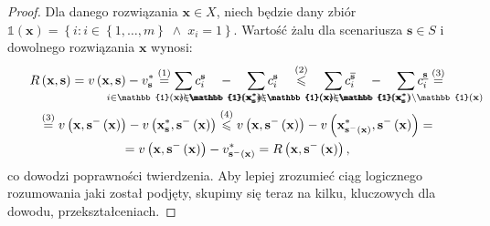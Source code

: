 \begin{proof}
	Dla danego rozwiązania $ \textbf{x} \in X$, niech będzie dany zbiór $\mathbb{1} \left( \textbf{x} \right) = \left\{ i : i \in \left\{ 1, \dots, m \right\} \; \wedge \; x_{i} = 1 \right\}$. Wartość żalu dla scenariusza $\textbf{s} \in S$ i dowolnego rozwiązania $\textbf{x}$ wynosi:
	\begin{gather*}
		R \left( \textbf{x}, \textbf{s} \right) = v \left( \textbf{x}, \textbf{s} \right) - v^{\ast}_{\textbf{s}} \overset{\left( 1 \right)}{=} \sum_{\mathclap{i \in \mathbb{1} \left( \textbf{x} \right) \setminus \mathbb{1} \left( \textbf{x}^{\ast}_{\textbf{s}} \right)}} c_{i}^{\textbf{s}} \quad - \quad \sum_{\mathclap{i \in \mathbb{1} \left( \textbf{x}^{\ast}_{\textbf{s}} \right) \setminus \mathbb{1} \left( \textbf{x} \right)}} c_{i}^{\textbf{s}} \quad \overset{\left( 2 \right)}{\leqslant} \quad \sum_{\mathclap{i \in \mathbb{1} \left( \textbf{x} \right) \setminus \mathbb{1} \left( \textbf{x}^{\ast}_{\textbf{s}} \right)}} c^{\overline{\textbf{s}}}_{i} \quad - \quad \sum_{\mathclap{i \in \mathbb{1} \left( \textbf{x}^{\ast}_{\textbf{s}} \right) \setminus \mathbb{1} \left( \textbf{x} \right)}} c^{\underline{\textbf{s}}}_{i} \overset{\left( 3 \right)}{=} \\ \overset{\left( 3 \right)}{=} v \left( \textbf{x}, \textbf{s}^{-} \left( \textbf{x} \right) \right) - v \left( \textbf{x}^{\ast}_{\textbf{s}}, \textbf{s}^{-} \left( \textbf{x} \right) \right) \overset{\left( 4 \right)}{\leqslant} v \left( \textbf{x}, \textbf{s}^{-} \left( \textbf{x} \right) \right) - v \left( \textbf{x}^{\ast}_{\textbf{s}^{-} \left( \textbf{x} \right)}, \textbf{s}^{-} \left( \textbf{x} \right) \right) = \\ = v \left( \textbf{x}, \textbf{s}^{-} \left( \textbf{x} \right) \right) - v^{\ast}_{\textbf{s}^{-} \left( \textbf{x} \right)} = R \left( \textbf{x}, \textbf{s}^{-} \left( \textbf{x} \right) \right)\text{,}
	\end{gather*}
	co dowodzi poprawności twierdzenia. Aby lepiej zrozumieć ciąg logicznego rozumowania jaki został podjęty, skupimy się teraz na kilku, kluczowych dla dowodu, przekształceniach.
	

\end{proof}
